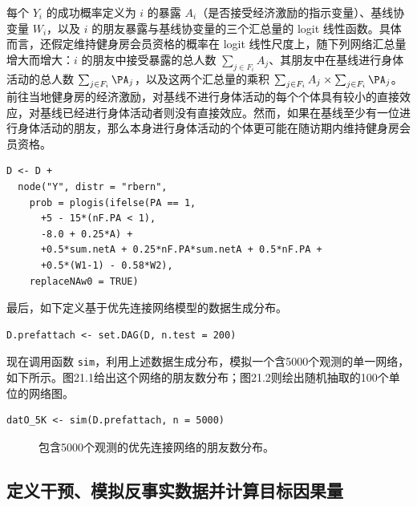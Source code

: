 每个 $Y_i$ 的成功概率定义为 $i$ 的暴露 $A_i$（是否接受经济激励的指示变量）、基线协变量 $W_i$，以及 $i$ 的朋友暴露与基线协变量的三个汇总量的 logit 线性函数。具体而言，还假定维持健身房会员资格的概率在 logit 线性尺度上，随下列网络汇总量增大而增大：$i$ 的朋友中接受暴露的总人数 $\sum_{j\in F_i}A_j$、其朋友中在基线进行身体活动的总人数 $\sum_{j\in F_i}\PA_j$，以及这两个汇总量的乘积 $\sum_{j\in F_i}A_j\times\sum_{j\in F_i}\PA_j$。前往当地健身房的经济激励，对基线不进行身体活动的每个个体具有较小的直接效应，对基线已经进行身体活动者则没有直接效应。然而，如果在基线至少有一位进行身体活动的朋友，那么本身进行身体活动的个体更可能在随访期内维持健身房会员资格。
\par\noindent\begin{minipage}{\linewidth}
\begin{lstlisting}[numbers=none,frame=none]
D <- D +
  node("Y", distr = "rbern",
    prob = plogis(ifelse(PA == 1,
      +5 - 15*(nF.PA < 1),
      -8.0 + 0.25*A) +
      +0.5*sum.netA + 0.25*nF.PA*sum.netA + 0.5*nF.PA +
      +0.5*(W1-1) - 0.58*W2),
    replaceNAw0 = TRUE)
\end{lstlisting}
\end{minipage}\par
最后，如下定义基于优先连接网络模型的数据生成分布。
\par\noindent\begin{minipage}{\linewidth}
\begin{lstlisting}[numbers=none,frame=none]
D.prefattach <- set.DAG(D, n.test = 200)
\end{lstlisting}
\end{minipage}\par
现在调用函数 \texttt{sim}，利用上述数据生成分布，模拟一个含5000个观测的单一网络，如下所示。图21.1给出这个网络的朋友数分布；图21.2则绘出随机抽取的100个单位的网络图。
\par\noindent\begin{minipage}{\linewidth}
\begin{lstlisting}[numbers=none,frame=none]
datO_5K <- sim(D.prefattach, n = 5000)
\end{lstlisting}
\end{minipage}\par

\begin{figure}[htbp]
 \centering
 
 \caption{包含5000个观测的优先连接网络的朋友数分布。}
 \label{fig:ch21:histogram}
\end{figure}

\subsection{定义干预、模拟反事实数据并计算目标因果量}

